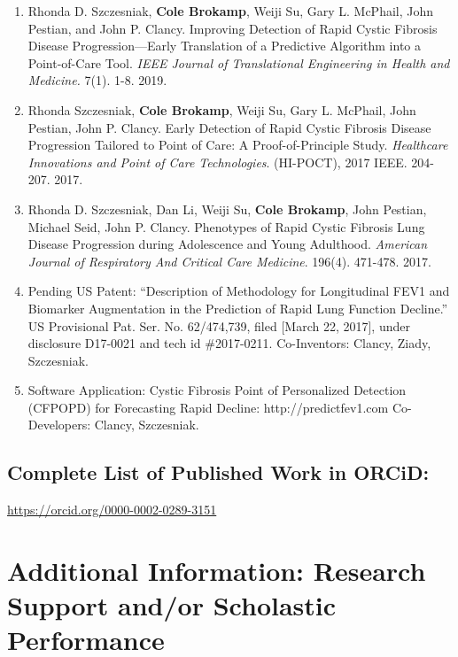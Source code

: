 \documentclass{nihbiosketch}
\begin{document}
\begin{enumerate}
\begin{enumerate}
	\item Rhonda D. Szczesniak, \textbf{Cole Brokamp}, Weiji Su, Gary L. McPhail,
    John Pestian, and John P. Clancy. Improving Detection of Rapid Cystic
    Fibrosis Disease Progression—Early Translation of a Predictive Algorithm
    into a Point-of-Care Tool. \textit{IEEE Journal of Translational Engineering
      in Health and Medicine.} 7(1). 1-8. 2019.

	\item Rhonda Szczesniak, \textbf{Cole Brokamp}, Weiji Su, Gary L. McPhail, John Pestian, John P. Clancy. Early Detection of Rapid Cystic Fibrosis Disease Progression Tailored to Point of Care: A Proof-of-Principle Study. \textit{Healthcare Innovations and Point of Care Technologies}. (HI-POCT), 2017 IEEE. 204-207. 2017.

	\item Rhonda D. Szczesniak, Dan Li, Weiji Su, \textbf{Cole Brokamp}, John Pestian, Michael Seid, John P. Clancy. Phenotypes of Rapid Cystic Fibrosis Lung Disease Progression during Adolescence and Young Adulthood. \textit{American Journal of Respiratory And Critical Care Medicine}. 196(4). 471-478. 2017.

  \item Pending US Patent: “Description of Methodology for Longitudinal FEV1 and Biomarker Augmentation in the Prediction of Rapid Lung Function Decline.” US Provisional Pat. Ser. No. 62/474,739, filed [March 22, 2017], under disclosure D17-0021 and tech id \#2017-0211. Co-Inventors: Clancy, Ziady, Szczesniak.

  \item Software Application: Cystic Fibrosis Point of Personalized Detection (CFPOPD) for Forecasting Rapid Decline: http://predictfev1.com Co-Developers: Clancy, Szczesniak.
  
\end{enumerate}

\end{enumerate}

\subsection*{Complete List of Published Work in ORCiD:} 
\url{https://orcid.org/0000-0002-0289-3151}

\section{Additional Information: Research Support and/or Scholastic Performance}
\end{document}
